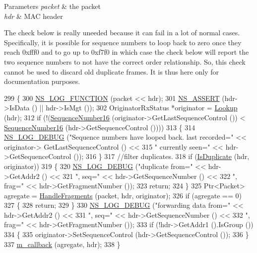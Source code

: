 \begin{DoxyParams}{Parameters}
{\em packet} & the packet \\
\hline
{\em hdr} & M\+AC header \\
\hline
\end{DoxyParams}
The check below is really uneeded because it can fail in a lot of normal cases. Specifically, it is possible for sequence numbers to loop back to zero once they reach 0xfff0 and to go up to 0xf7f0 in which case the check below will report the two sequence numbers to not have the correct order relationship. So, this check cannot be used to discard old duplicate frames. It is thus here only for documentation purposes.
\begin{DoxyCode}
299 \{
300   \hyperlink{log-macros-disabled_8h_a90b90d5bad1f39cb1b64923ea94c0761}{NS\_LOG\_FUNCTION} (packet << hdr);
301   \hyperlink{assert_8h_a6dccdb0de9b252f60088ce281c49d052}{NS\_ASSERT} (hdr->IsData () || hdr->IsMgt ());
302   OriginatorRxStatus *originator = \hyperlink{classns3_1_1MacRxMiddle_ac7ff36607c9fa9f207d70bd1c7f14bc7}{Lookup} (hdr);
312   \textcolor{keywordflow}{if} (!(\hyperlink{group__network_gaf266f5a4c5719a6897638f91ced3b5af}{SequenceNumber16} (originator->GetLastSequenceControl ()) < 
      \hyperlink{group__network_gaf266f5a4c5719a6897638f91ced3b5af}{SequenceNumber16} (hdr->GetSequenceControl ())))
313     \{
314       \hyperlink{group__logging_ga413f1886406d49f59a6a0a89b77b4d0a}{NS\_LOG\_DEBUG} (\textcolor{stringliteral}{"Sequence numbers have looped back. last recorded="} << originator->
      GetLastSequenceControl () <<
315                     \textcolor{stringliteral}{" currently seen="} << hdr->GetSequenceControl ());
316     \}
317   \textcolor{comment}{//filter duplicates.}
318   \textcolor{keywordflow}{if} (\hyperlink{classns3_1_1MacRxMiddle_adef5584d8c8059e842a4bce9c4321b88}{IsDuplicate} (hdr, originator))
319     \{
320       \hyperlink{group__logging_ga413f1886406d49f59a6a0a89b77b4d0a}{NS\_LOG\_DEBUG} (\textcolor{stringliteral}{"duplicate from="} << hdr->GetAddr2 () <<
321                     \textcolor{stringliteral}{", seq="} << hdr->GetSequenceNumber () <<
322                     \textcolor{stringliteral}{", frag="} << hdr->GetFragmentNumber ());
323       \textcolor{keywordflow}{return};
324     \}
325   Ptr<Packet> agregate = \hyperlink{classns3_1_1MacRxMiddle_ae595f60963be22a3e28975572f3e0707}{HandleFragments} (packet, hdr, originator);
326   \textcolor{keywordflow}{if} (agregate == 0)
327     \{
328       \textcolor{keywordflow}{return};
329     \}
330   \hyperlink{group__logging_ga413f1886406d49f59a6a0a89b77b4d0a}{NS\_LOG\_DEBUG} (\textcolor{stringliteral}{"forwarding data from="} << hdr->GetAddr2 () <<
331                 \textcolor{stringliteral}{", seq="} << hdr->GetSequenceNumber () <<
332                 \textcolor{stringliteral}{", frag="} << hdr->GetFragmentNumber ());
333   \textcolor{keywordflow}{if} (!hdr->GetAddr1 ().IsGroup ())
334     \{
335       originator->SetSequenceControl (hdr->GetSequenceControl ());
336     \}
337   \hyperlink{classns3_1_1MacRxMiddle_aba181a02e2199e5d4093d9ce51646f94}{m\_callback} (agregate, hdr);
338 \}
\end{DoxyCode}


